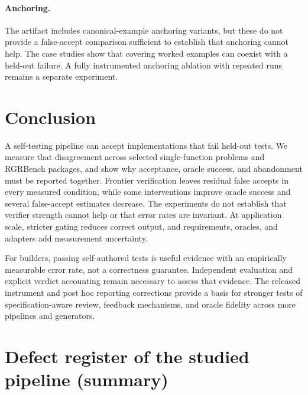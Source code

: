 \documentclass{article}
\begin{document}
\paragraph{Anchoring.} The artifact includes canonical-example anchoring variants, but these do
not provide a false-accept comparison sufficient to establish that anchoring cannot help. The
case studies show that covering worked examples can coexist with a held-out failure. A fully
instrumented anchoring ablation with repeated runs remains a separate experiment.

\section{Conclusion}
\label{sec:conclusion}

A self-testing pipeline can accept implementations that fail held-out tests. We measure
that disagreement across selected single-function problems and RGRBench packages, and show
why acceptance, oracle success, and abandonment must be reported together. Frontier
verification leaves residual false accepts in every measured condition, while some
interventions improve oracle success and several false-accept estimates decrease. The
experiments do not establish that verifier strength cannot help or that error rates are
invariant. At application scale, stricter gating reduces correct output, and requirements,
oracles, and adapters add measurement uncertainty.

For builders, passing self-authored tests is useful evidence with an empirically measurable
error rate, not a correctness guarantee. Independent evaluation and explicit verdict
accounting remain necessary to assess that evidence. The released instrument and post hoc
reporting corrections provide a basis for stronger tests of specification-aware review,
feedback mechanisms, and oracle fidelity across more pipelines and generators.




\appendix

\section{Defect register of the studied pipeline (summary)}
\label{app:register}
\end{document}
